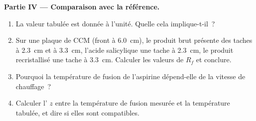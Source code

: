\begin{problem}
\noindent\textbf{Partie IV --- Comparaison avec la référence.}
\begin{enumerate}[resume]
  \item La valeur tabulée est donnée à l'unité. Quelle 
        cela implique-t-il~?
  \item Sur une plaque de CCM (front à \qty{6.0}{cm}), le produit brut
        présente des taches à \qty{2.3}{cm} et à \qty{3.3}{cm}, l'acide
        salicylique une tache à \qty{2.3}{cm}, le produit recristallisé
        une tache à \qty{3.3}{cm}. Calculer les valeurs de $R_f$ et
        conclure.
  \item Pourquoi la température de fusion de l'aspirine dépend-elle de la
        vitesse de chauffage~?
  \item Calculer l' $z$ entre la température de fusion
        mesurée et la température tabulée, et dire si elles sont
        compatibles.
\end{enumerate}
\end{problem}
